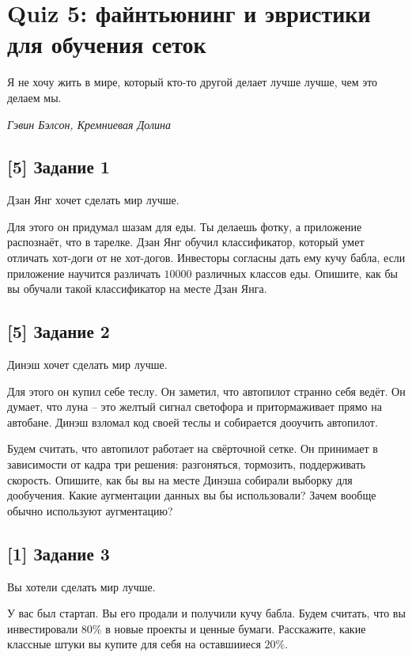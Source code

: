 \documentclass[12pt, a4paper, oneside]{article}
\begin{document}
\section*{Quiz 5: файнтьюнинг и эвристики для обучения сеток}

\epigraph{Я не хочу жить в мире, который кто-то другой делает лучше лучше, чем это делаем мы.}{\textit{Гэвин Бэлсон, Кремниевая Долина}}

\vspace{-0.5cm}
\subsection*{[5] Задание 1}
\vspace{-0.5cm}

Дзан Янг хочет сделать мир лучше. 

Для этого он придумал шазам для еды. Ты делаешь фотку, а приложение распознаёт, что в тарелке. Дзан Янг обучил классификатор, который умет отличать хот-доги от не хот-догов. Инвесторы согласны дать ему кучу бабла, если приложение научится различать $10 000$ различных классов еды.  Опишите, как бы вы обучали такой классификатор на месте Дзан Янга.

\vspace{-0.5cm}
\subsection*{[5] Задание 2}
\vspace{-0.5cm}

Динэш хочет сделать мир лучше. 

Для этого он купил себе теслу. Он заметил, что автопилот странно себя ведёт. Он думает, что луна -- это желтый сигнал светофора и притормаживает прямо на автобане. Динэш взломал код своей теслы и собирается дооучить автопилот. 

Будем считать, что автопилот работает на свёрточной сетке. Он принимает в зависимости от кадра три решения: разгоняться, тормозить, поддерживать скорость. Опишите, как бы вы на месте Динэша собирали выборку для дообучения. Какие аугментации данных вы бы использовали? Зачем вообще обычно используют аугментацию?

\vspace{-0.5cm}
\subsection*{[1] Задание 3}
\vspace{-0.5cm}

Вы хотели сделать мир лучше. 

У вас был стартап. Вы его продали и получили кучу бабла. Будем считать, что вы инвестировали $80\%$ в новые проекты и ценные бумаги. Расскажите, какие классные штуки вы купите для себя на оставшииеся $20\%$.
\end{document}
